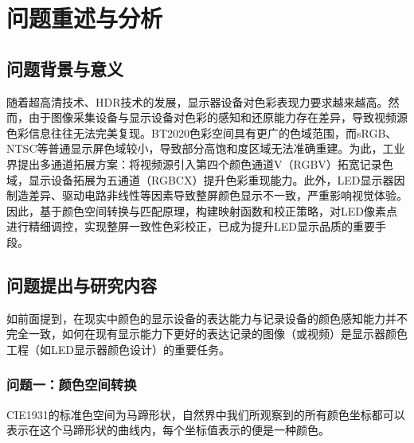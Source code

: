 \chapter[\hspace{0pt}问题重述与分析]{{\heiti{}\hspace{0pt}问题重述与分析}}\label{chapter1: 问题重述与分析}

\removelofgap
\removelotgap

\section[\hspace{-2pt}问题背景与意义]{{\heiti{} \hspace{-8pt}问题背景与意义}}\label{section1: 问题背景与意义}

随着超高清技术、HDR技术的发展，显示器设备对色彩表现力要求越来越高。然而，由于图像采集设备与显示设备对色彩的感知和还原能力存在差异，导致视频源色彩信息往往无法完美复现。\cite{bt2020standard}BT2020色彩空间具有更广的色域范围，而sRGB、NTSC等普通显示屏色域较小，导致部分高饱和度区域无法准确重建。为此，工业界提出多通道拓展方案：将视频源引入第四个颜色通道V（RGBV）拓宽记录色域，显示设备拓展为五通道（RGBCX）提升色彩重现能力。此外，LED显示器因制造差异、驱动电路非线性等因素导致整屏颜色显示不一致，严重影响视觉体验。因此，基于颜色空间转换与匹配原理，构建映射函数和校正策略，对LED像素点进行精细调控，实现整屏一致性色彩校正，已成为提升LED显示品质的重要手段。

\section[\hspace{-2pt}问题提出与研究内容]{{\heiti{} \hspace{-8pt}问题提出与研究内容}}\label{section1: 问题提出与研究内容}

如前面提到，在现实中颜色的显示设备的表达能力与记录设备的颜色感知能力并不完全一致，如何在现有显示能力下更好的表达记录的图像（或视频）是显示器颜色工程（如LED显示器颜色设计）的重要任务。

\subsection[\hspace{-2pt}问题一：颜色空间转换]{{\heiti{} \hspace{-8pt}问题一：颜色空间转换}}\label{subsection1: 问题一}

CIE1931的标准色空间为马蹄形状，自然界中我们所观察到的所有颜色坐标都可以表示在这个马蹄形状的曲线内，每个坐标值表示的便是一种颜色。

